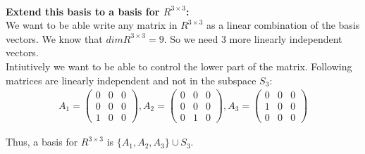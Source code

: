 \documentclass{article}
\begin{document}
\\
\textbf{Extend this basis to a basis for \(R^{3 \times 3}\):} \\
We want to be able write any matrix in \(R^{3 \times 3}\) as a linear combination of the basis vectors. We know that \(dim R^{3 \times 3} = 9\). So we need 3 more linearly independent vectors. \\
Intiutively we want to be able to control the lower part of the matrix. Following matrices are linearly independent and not in the subspace \(S_3\):
\begin{align*}
   A_1 = \begin{pmatrix}
      0 & 0 & 0 \\
      0 & 0 & 0 \\
      1 & 0 & 0
   \end{pmatrix}, A_2 = \begin{pmatrix}
      0 & 0 & 0 \\
      0 & 0 & 0 \\
      0 & 1 & 0
   \end{pmatrix}, A_3 = \begin{pmatrix}
      0 & 0 & 0 \\
      1 & 0 & 0 \\
      0 & 0 & 0
   \end{pmatrix}
\end{align*}

Thus, a basis for \(R^{3 \times 3}\) is \(\{A_1, A_2, A_3\} \cup S_3\).
\end{document}
